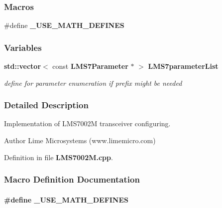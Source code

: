 \subsubsection*{Macros}
\begin{DoxyCompactItemize}
\item 
\#define {\bf \+\_\+\+U\+S\+E\+\_\+\+M\+A\+T\+H\+\_\+\+D\+E\+F\+I\+N\+ES}
\end{DoxyCompactItemize}
\subsubsection*{Variables}
\begin{DoxyCompactItemize}
\item 
{\bf std\+::vector}$<$ const {\bf L\+M\+S7\+Parameter} $\ast$ $>$ {\bf L\+M\+S7parameter\+List}
\begin{DoxyCompactList}\small\item\em define for parameter enumeration if prefix might be needed \end{DoxyCompactList}\end{DoxyCompactItemize}


\subsubsection{Detailed Description}
Implementation of L\+M\+S7002M transceiver configuring. 

\begin{DoxyAuthor}{Author}
Lime Microsystems (www.\+limemicro.\+com) 
\end{DoxyAuthor}


Definition in file {\bf L\+M\+S7002\+M.\+cpp}.



\subsubsection{Macro Definition Documentation}
\paragraph[{\+\_\+\+U\+S\+E\+\_\+\+M\+A\+T\+H\+\_\+\+D\+E\+F\+I\+N\+ES}]{\setlength{\rightskip}{0pt plus 5cm}\#define \+\_\+\+U\+S\+E\+\_\+\+M\+A\+T\+H\+\_\+\+D\+E\+F\+I\+N\+ES}\label{LMS7002M_8cpp_a525335710b53cb064ca56b936120431e}


